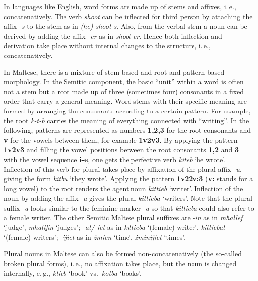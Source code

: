 \begin{multicols}{2}
In languages like English, word forms are made up of stems and affixes, i.\,e., concatenatively. The verb \emph{shoot} can be inflected for third person by attaching the affix \emph{-s} to the stem as in \emph{(he) shoot-s}. Also, from the verbal stem a noun can be derived by adding the affix \emph{-er} as in \emph{shoot-er}. Hence both inflection and derivation take place without internal changes to the structure, i.\,e., concatenatively. 

In Maltese, there is a mixture of stem-based and root-and-pattern-based morphology. In the Semitic component, the basic ``unit'' within a word is often not a stem but a root made up of three (sometimes four) consonants in a fixed order that carry a general meaning. Word stems with their specific meaning are formed by arranging the consonants according to a certain pattern. For example, the root \emph{k-t-b} carries the meaning of everything connected with ``writing''. In the following, patterns are represented as numbers \textbf{1,2,3} for the root consonants and \textbf{v} for the vowels between them, for example \textbf{1v2v3}. By applying the pattern \textbf{1v2v3} and filling the vowel positions between the root consonants \textbf{1,2} and \textbf{3} with the vowel sequence \textbf{i-e}, one gets the perfective verb \emph{kiteb} `he wrote'. Inflection of this verb for plural takes place by affixation of the plural affix \emph{-u}, giving the form \emph{kitbu} `they wrote'. Applying the pattern \textbf{1v22v:3} (\textbf{v:} stands for a long vowel) to the root renders the agent noun \emph{kittieb} `writer'. Inflection of the noun by adding the affix \emph{-a} gives the plural \emph{kittieba} `writers'. Note that the plural suffix \emph{-a} looks similar to the feminine marker \emph{-a} so that \emph{kittieba} could also refer to a female writer. The other Semitic Maltese plural suffixes are \emph{-in} as in \emph{mħallef} `judge', \emph{mħallfin} `judges'; \emph{-at/-iet} as in \emph{kittieba} `(female) writer', \emph{kittiebat} `(female) writers'; \emph{-ijiet} as in \emph{żmien} `time', \emph{żminijiet} `times'.

Plural nouns in Maltese can also be formed non-concatenatively (the so-called broken plural forms), i.\,e., no affixation takes place, but the noun is changed internally, e.\,g., \emph{ktieb} `book' vs.~\emph{kotba} `books'.


\end{multicols}
